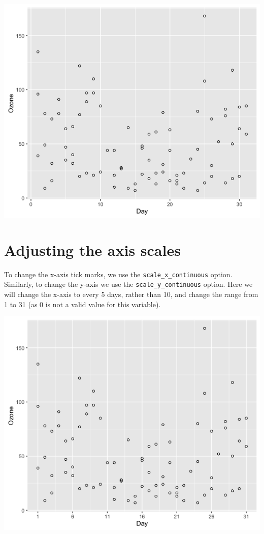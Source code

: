 \begin{Shaded}
\begin{Highlighting}[]
\StringTok{ }\NormalTok{(}  \StringTok{ }\NormalTok{(} \NormalTok{)}
\end{Highlighting}
\end{Shaded}

\begin{center}\includegraphics[width=0.55\linewidth]{0_all_posts_pdf/scatter_2-1} \end{center}

\section{Adjusting the axis scales}\label{adjusting-the-axis-scales}

To change the x-axis tick marks, we use the
\texttt{scale\_x\_continuous} option. Similarly, to change the y-axis we
use the \texttt{scale\_y\_continuous} option. Here we will change the
x-axis to every 5 days, rather than 10, and change the range from 1 to
31 (as 0 is not a valid value for this variable).

\begin{Shaded}
\begin{Highlighting}[]
\StringTok{ }\StringTok{ }\NormalTok{(} \NormalTok{(}\NormalTok{, }\NormalTok{, }\NormalTok{))}
\end{Highlighting}
\end{Shaded}

\begin{center}\includegraphics[width=0.55\linewidth]{0_all_posts_pdf/scatter_3-1} \end{center}

